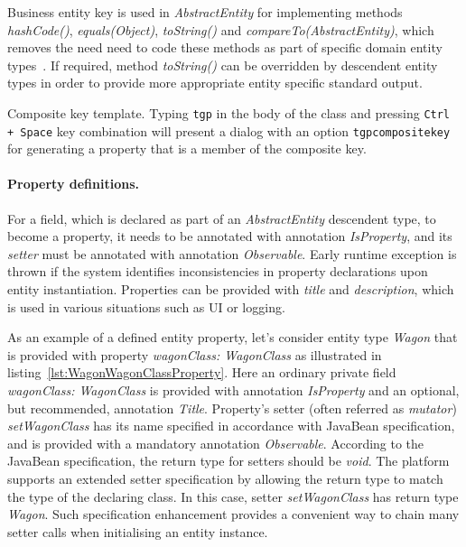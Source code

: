   Business entity key is used in \emph{AbstractEntity} for implementing methods \emph{hashCode()}, \emph{equals(Object)}, \emph{toString()} and \emph{compareTo(AbstractEntity)}, which removes the need  need to code these methods as part of specific domain entity types~\cite{Bloch2008}.
  If required, method \emph{toString()} can be overridden by descendent entity types in order to provide more appropriate entity specific standard output.

  \begin{notebox}{Composite key template.}{\label{nb:EclipseTemplatesForCompositeKey}}
    Typing \texttt{tgp} in the body of the class and pressing \texttt{Ctrl + Space} key combination will present a dialog with an option \texttt{tgpcompositekey} for generating a property that is a member of the composite key.
  \end{notebox}

  \paragraph*{Property definitions.}
  
  For a field, which is declared as part of an \emph{AbstractEntity} descendent type, to become a property, it needs to be annotated with annotation \emph{IsProperty}, and its \emph{setter} must be annotated with annotation \emph{Observable}.
  Early runtime exception is thrown if the system identifies inconsistencies in property declarations upon entity instantiation.
  Properties can be provided with \emph{title} and \emph{description}, which is used in various situations such as UI or logging.
  
  As an example of a defined entity property, let's consider entity type \emph{Wagon} that is provided with property \emph{wagonClass: WagonClass} as illustrated in listing~\ref{lst:WagonWagonClassProperty}.
  Here an ordinary private field \emph{wagonClass: WagonClass} is provided with annotation \emph{IsProperty} and an optional, but recommended, annotation \emph{Title}.
  Property's setter (often referred as \emph{mutator}) \emph{setWagonClass} has its name specified in accordance with JavaBean specification, and is provided with a mandatory annotation \emph{Observable}.
  According to the JavaBean specification, the return type for setters should be \emph{void}.
  The platform supports an extended setter specification by allowing the return type to match the type of the declaring class.
  In this case, setter \emph{setWagonClass} has return type \emph{Wagon}.
  Such specification enhancement provides a convenient way to chain many setter calls when initialising an entity instance.
  
